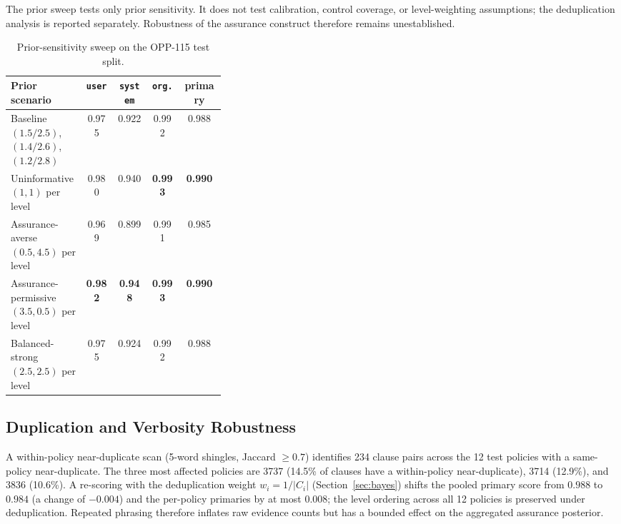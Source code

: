 \documentclass[final,3p,times,twocolumn]{elsarticle}
\begin{document}
	\begin{table}[h]
		\centering
		\caption{Prior-sensitivity sweep on the OPP-115 test split.}
		\label{tab:priors} 
	The prior sweep tests only prior sensitivity. It does not test calibration,
	control coverage, or level-weighting assumptions; the deduplication analysis
	is reported separately. Robustness of the assurance construct therefore remains
	unestablished.
        
        
        
        
        \footnotesize
		\setlength{\tabcolsep}{2pt}
		\begin{tabular}{@{}>{\raggedright\arraybackslash}p{0.35\linewidth}cccc@{}}
			\toprule \textbf{Prior scenario}                        & \texttt{user}          & \texttt{system}          & \texttt{org.}          & \textbf{primary} \\
			\midrule Baseline $(1.5/2.5)$, $(1.4/2.6)$, $(1.2/2.8)$ & 0.975                  & 0.922                    & 0.992                  & 0.988            \\
			Uninformative $(1, 1)$ per level                        & 0.980                  & 0.940                    & \textbf{0.993}         & \textbf{0.990}   \\
			Assurance-averse $(0.5, 4.5)$ per level                 & 0.969                  & 0.899                    & 0.991                  & 0.985            \\
			Assurance-permissive $(3.5, 0.5)$ per level             & \textbf{0.982}         & \textbf{0.948}           & \textbf{0.993}         & \textbf{0.990}   \\
			Balanced-strong $(2.5, 2.5)$ per level                  & 0.975                  & 0.924                    & 0.992                  & 0.988            \\
			\bottomrule
		\end{tabular}
	\end{table}

	\subsection{Duplication and Verbosity Robustness}
	\label{sec:duplication} A within-policy near-duplicate scan (5-word shingles,
	Jaccard $\geq 0.7$) identifies 234 clause pairs across the 12 test policies with
	a same-policy near-duplicate. The three most affected policies are 3737 (14.5\%
	of clauses have a within-policy near-duplicate), 3714 (12.9\%), and 3836 (10.6\%).
	A re-scoring with the deduplication weight $w_{i} = 1/|C_{i}|$ (Section~\ref{sec:bayes})
	shifts the pooled primary score from $0.988$ to $0.984$ (a change of $-0.004$)
	and the per-policy primaries by at most $0.008$; the level ordering across all
	12 policies is preserved under deduplication. Repeated phrasing therefore
	inflates raw evidence counts but has a bounded effect on the aggregated
	assurance posterior.
    
\end{document}

